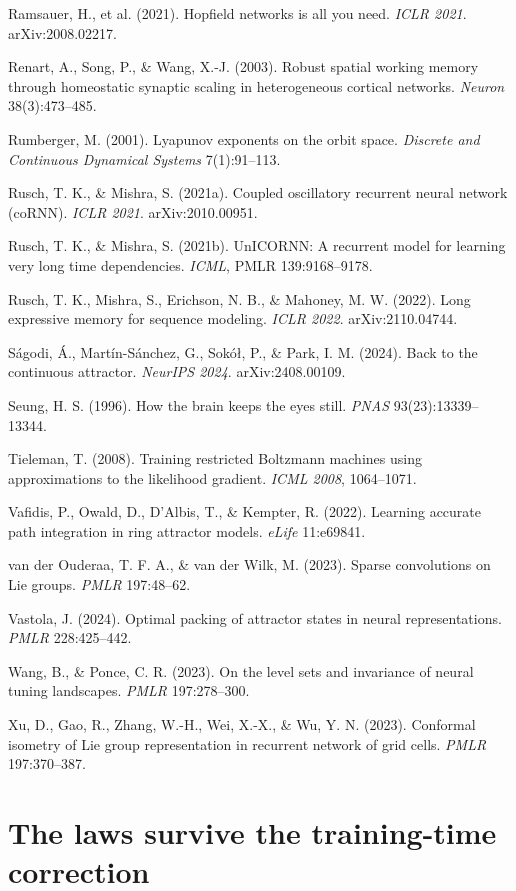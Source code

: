 \documentclass{article}
\begin{document}
Ramsauer, H., et al. (2021). Hopfield networks is all you need. \emph{ICLR 2021}. arXiv:2008.02217.

Renart, A., Song, P., \& Wang, X.-J. (2003). Robust spatial working memory through homeostatic synaptic scaling in heterogeneous cortical networks. \emph{Neuron} 38(3):473--485.

Rumberger, M. (2001). Lyapunov exponents on the orbit space. \emph{Discrete and Continuous Dynamical Systems} 7(1):91--113.

Rusch, T. K., \& Mishra, S. (2021a). Coupled oscillatory recurrent neural network (coRNN). \emph{ICLR 2021}. arXiv:2010.00951.

Rusch, T. K., \& Mishra, S. (2021b). UnICORNN: A recurrent model for learning very long time dependencies. \emph{ICML}, PMLR 139:9168--9178.

Rusch, T. K., Mishra, S., Erichson, N. B., \& Mahoney, M. W. (2022). Long expressive memory for sequence modeling. \emph{ICLR 2022}. arXiv:2110.04744.

S\'agodi, \'A., Mart\'in-S\'anchez, G., Sokó\l, P., \& Park, I. M. (2024). Back to the continuous attractor. \emph{NeurIPS 2024}. arXiv:2408.00109.

Seung, H. S. (1996). How the brain keeps the eyes still. \emph{PNAS} 93(23):13339--13344.


Tieleman, T. (2008). Training restricted Boltzmann machines using approximations to the likelihood gradient. \emph{ICML 2008}, 1064--1071.

Vafidis, P., Owald, D., D'Albis, T., \& Kempter, R. (2022). Learning accurate path integration in ring attractor models. \emph{eLife} 11:e69841.

van der Ouderaa, T. F. A., \& van der Wilk, M. (2023). Sparse convolutions on Lie groups. \emph{PMLR} 197:48--62.

Vastola, J. (2024). Optimal packing of attractor states in neural representations. \emph{PMLR} 228:425--442.

Wang, B., \& Ponce, C. R. (2023). On the level sets and invariance of neural tuning landscapes. \emph{PMLR} 197:278--300.

Xu, D., Gao, R., Zhang, W.-H., Wei, X.-X., \& Wu, Y. N. (2023). Conformal isometry of Lie group representation in recurrent network of grid cells. \emph{PMLR} 197:370--387.
\endgroup

\appendix

\section{The laws survive the training-time correction}\label{app:anchor}
\end{document}
